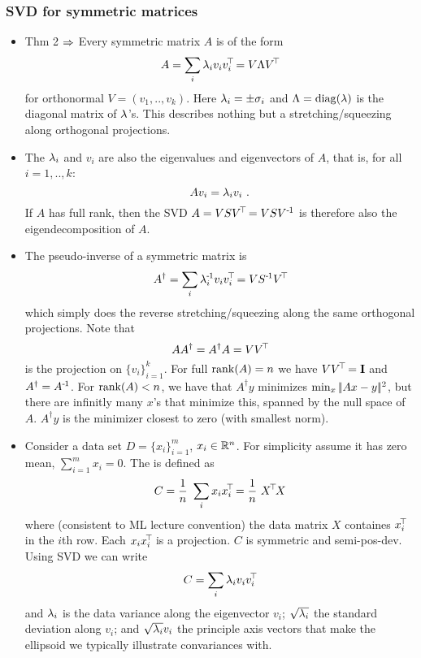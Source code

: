 \subsubsection{SVD for symmetric matrices}

\begin{itemize}
\item Thm 2 $\Rightarrow$ Every symmetric matrix $A$ is of the form
\begin{equation}
A = \sum_i \lambda_i v_i v_i^{\!\top\!} = V \Lambda V^{\!\top\!}
\end{equation}
for orthonormal
$V=(v_1,..,v_k)$. Here $\lambda_i = \pm \sigma_i$ and $\Lambda={\rm diag}(\lambda)$ is the diagonal
matrix of $\lambda$'s. This describes nothing but a stretching/squeezing
along orthogonal projections.

\item The $\lambda_i$ and $v_i$ are also the eigenvalues and eigenvectors
of $A$, that is, for all $i=1,..,k$:
\begin{equation}
A v_i = \lambda_i v_i ~.
\end{equation}
If $A$ has full rank, then the SVD $A = V S
V^{\!\top\!} = V S V^{{\hspace*{-.0pt}\text{\rm -}\hspace*{-.5pt}}1}$ is therefore also the eigendecomposition of $A$.

\item The pseudo-inverse of a symmetric matrix is
\begin{equation}
A^\dagger = \sum_i \lambda_i^{{\hspace*{-.0pt}\text{\rm -}\hspace*{-.5pt}}1} v_i v_i^{\!\top\!} = V S^{{\hspace*{-.0pt}\text{\rm -}\hspace*{-.5pt}}1} V^{\!\top\!}
\end{equation}
which simply
does the reverse stretching/squeezing along the same orthogonal
projections. Note that
\begin{equation}
A A^\dagger = A^\dagger A = V V^{\!\top\!}
\end{equation}
is the projection on
$\{v_i\}_{i=1}^k$. For full ${\rm rank}(A)=n$ we have $V V^{\!\top\!}={\rm\bf I}$ and
$A^\dagger = A^{{\hspace*{-.0pt}\text{\rm -}\hspace*{-.5pt}}1}$. For ${\rm rank}(A)<n$, we have that $A^\dagger y$
minimizes $\min_x |\!|A x - y|\!|^2$, but there are infinitly many
$x$'s that minimize this, spanned by the null space of $A$. $A^\dagger
y$ is the minimizer closest to zero (with smallest norm).

\item Consider a data set $D = \{x_i\}_{i=1}^m$, $x_i\in{\mathbb{R}}^n$. For simplicity assume
it has zero mean, $\sum_{i=1}^m x_i = 0$. The  is defined as
\begin{equation}
C = \frac{1}{n}~ \sum_i x_i x_i^{\!\top\!} = \frac{1}{n}~ X^{\!\top\!} X
\end{equation}
where (consistent to ML lecture convention) the data matrix $X$
containes $x_i^{\!\top\!}$ in the $i$th row. Each $x_i x_i^{\!\top\!}$ is a
projection. $C$ is symmetric and semi-pos-dev. Using SVD we can write
\begin{equation}
C = \sum_i \lambda_i v_i v_i^{\!\top\!}
\end{equation}
and $\lambda_i$ is the data variance along the eigenvector $v_i$;
$\sqrt{\lambda_i}$ the standard deviation along $v_i$; and $\sqrt{\lambda_i} 
v_i$ the principle axis vectors that make the ellipsoid we typically
illustrate convariances with.
\end{itemize}

